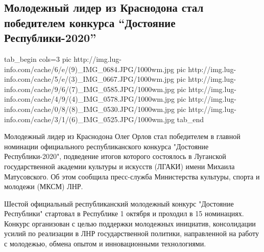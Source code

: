  
 
 
 
 
 
\subsection{Молодежный лидер из Краснодона стал победителем конкурса \enquote{Достояние Республики-2020}}
\label{sec:15_12_2020.news.lnr.lug_info.1.dostojanie_respubliki}

\ifcmt
tab_begin cols=3
	pic http://img.lug-info.com/cache/6/e/(9)_IMG_0684.JPG/1000wm.jpg
	pic http://img.lug-info.com/cache/5/e/(3)_IMG_0667.JPG/1000wm.jpg
	pic http://img.lug-info.com/cache/9/6/(7)_IMG_0585.JPG/1000wm.jpg
	pic http://img.lug-info.com/cache/4/9/(4)_IMG_0578.JPG/1000wm.jpg
	pic http://img.lug-info.com/cache/0/8/(8)_IMG_0530.JPG/1000wm.jpg
	pic http://img.lug-info.com/cache/3/1/(6)_IMG_0525.JPG/1000wm.jpg
tab_end
\fi




Молодежный лидер из Краснодона Олег Орлов стал победителем в главной номинации
официального республиканского конкурса "Достояние Республики-2020", подведение
итогов которого состоялось в Луганской государственной академии культуры и
искусств (ЛГАКИ) имени Михаила Матусовского. Об этом сообщила пресс-служба
Министерства культуры, спорта и молодежи (МКСМ) ЛНР.  

Шестой официальный республиканский молодежный конкурс "Достояние Республики"
стартовал в Республике 1 октября и проходил в 15 номинациях. Конкурс
организован с целью поддержки молодежных инициатив, консолидации усилий по
реализации в ЛНР государственной политики, направленной на работу с молодежью,
обмена опытом и инновационными технологиями.


